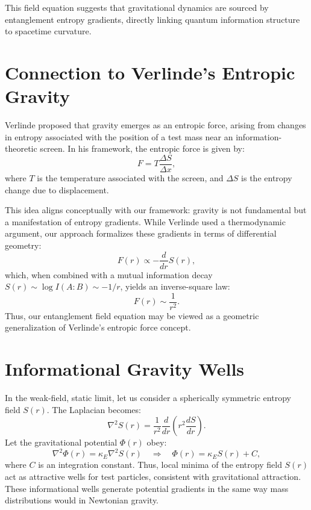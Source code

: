 \documentclass[12pt]{article}
\begin{document}
This field equation suggests that gravitational dynamics are sourced by entanglement entropy gradients, directly linking quantum information structure to spacetime curvature.

\section{Connection to Verlinde's Entropic Gravity}
Verlinde proposed that gravity emerges as an entropic force, arising from changes in entropy associated with the position of a test mass near an information-theoretic screen. In his framework, the entropic force is given by:
\begin{equation}
F = T \frac{\Delta S}{\Delta x},
\end{equation}
where \(T\) is the temperature associated with the screen, and \(\Delta S\) is the entropy change due to displacement.

This idea aligns conceptually with our framework: gravity is not fundamental but a manifestation of entropy gradients. While Verlinde used a thermodynamic argument, our approach formalizes these gradients in terms of differential geometry:
\begin{equation}
F(r) \propto -\frac{d}{dr} S(r),
\end{equation}
which, when combined with a mutual information decay \(S(r) \sim \log I(A:B) \sim -1/r\), yields an inverse-square law:
\begin{equation}
F(r) \sim \frac{1}{r^2}.
\end{equation}
Thus, our entanglement field equation may be viewed as a geometric generalization of Verlinde's entropic force concept.

\section{Informational Gravity Wells}
In the weak-field, static limit, let us consider a spherically symmetric entropy field \(S(r)\). The Laplacian becomes:
\begin{equation}
\nabla^2 S(r) = \frac{1}{r^2} \frac{d}{dr}\left(r^2 \frac{dS}{dr}\right).
\end{equation}
Let the gravitational potential \(\Phi(r)\) obey:
\begin{equation}
\nabla^2 \Phi(r) = \kappa_E \nabla^2 S(r) \quad \Rightarrow \quad \Phi(r) = \kappa_E S(r) + C,
\end{equation}
where \(C\) is an integration constant. Thus, local minima of the entropy field \(S(r)\) act as attractive wells for test particles, consistent with gravitational attraction. These informational wells generate potential gradients in the same way mass distributions would in Newtonian gravity.
\end{document}
